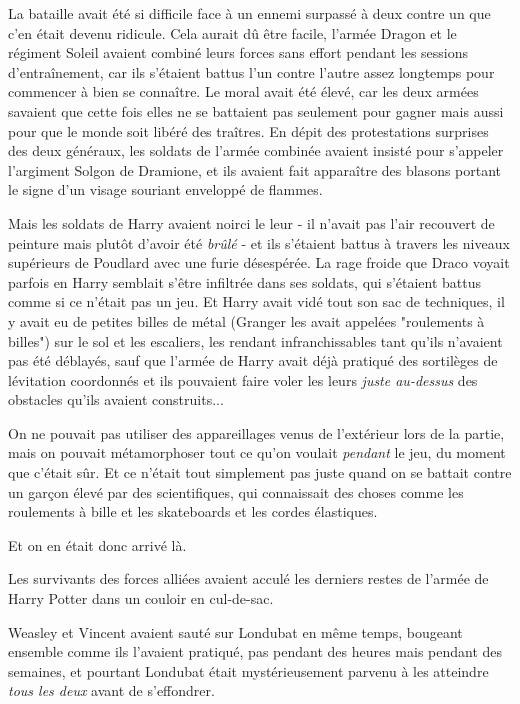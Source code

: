 La bataille avait été si difficile face à un ennemi surpassé à deux contre un que c'en était devenu ridicule. Cela aurait dû être facile, l'armée Dragon et le régiment Soleil avaient combiné leurs forces sans effort pendant les sessions d'entraînement, car ils s'étaient battus l'un contre l'autre assez longtemps pour commencer à bien se connaître. Le moral avait été élevé, car les deux armées savaient que cette fois elles ne se battaient pas seulement pour gagner mais aussi pour que le monde soit libéré des traîtres. En dépit des protestations surprises des deux généraux, les soldats de l'armée combinée avaient insisté pour s'appeler l'argiment Solgon de Dramione, et ils avaient fait apparaître des blasons portant le signe d'un visage souriant enveloppé de flammes.

Mais les soldats de Harry avaient noirci le leur - il n'avait pas l'air recouvert de peinture mais plutôt d'avoir été \emph{brûlé}  - et ils s'étaient battus à travers les niveaux supérieurs de Poudlard avec une furie désespérée. La rage froide que Draco voyait parfois en Harry semblait s'être infiltrée dans ses soldats, qui s'étaient battus comme si ce n'était pas un jeu. Et Harry avait vidé tout son sac de techniques, il y avait eu de petites billes de métal (Granger les avait appelées "roulements à billes") sur le sol et les escaliers, les rendant infranchissables tant qu'ils n'avaient pas été déblayés, sauf que l'armée de Harry avait déjà pratiqué des sortilèges de lévitation coordonnés et ils pouvaient faire voler les leurs \emph{juste au-dessus } des obstacles qu'ils avaient construits...

On ne pouvait pas utiliser des appareillages venus de l'extérieur lors de la partie, mais on pouvait métamorphoser tout ce qu'on voulait \emph{pendant}  le jeu, du moment que c'était sûr. Et ce n'était tout simplement pas juste quand on se battait contre un garçon élevé par des scientifiques, qui connaissait des choses comme les roulements à bille et les skateboards et les cordes élastiques.

Et on en était donc arrivé là.

Les survivants des forces alliées avaient acculé les derniers restes de l'armée de Harry Potter dans un couloir en cul-de-sac.

Weasley et Vincent avaient sauté sur Londubat en même temps, bougeant ensemble comme ils l'avaient pratiqué, pas pendant des heures mais pendant des semaines, et pourtant Londubat était mystérieusement parvenu à les atteindre \emph{tous les deux}  avant de s'effondrer.

